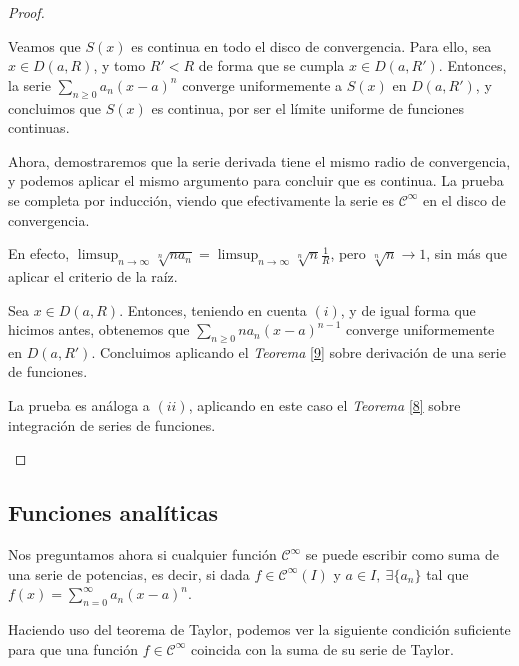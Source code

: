  \begin{proof} \hfill
  \begin{nlist}
     \item Veamos que $S(x)$ es continua en todo el disco de convergencia. Para ello, sea $x \in D(a,R)$, y tomo $R' < R$ de forma que se cumpla $x \in D(a,R')$. Entonces, la serie $\sum_{n\geq 0} a_n (x-a)^n$ converge uniformemente a $S(x)$ en $D(a,R')$, y concluimos que $S(x)$ es continua, por ser el límite uniforme de funciones continuas.

   Ahora, demostraremos que la serie derivada tiene el mismo radio de convergencia, y podemos aplicar el mismo argumento para concluir que es continua. La prueba se completa por inducción, viendo que efectivamente la serie es $\mathcal C^\infty$ en el disco de convergencia.

   En efecto, $\displaystyle\limsup_{n\to\infty}\sqrt[n]{n a_n} = \limsup_{n\to\infty} \sqrt[n]{n} \frac{1}{R}$, pero $\sqrt[n]{n} \to 1$, sin más que aplicar el criterio de la raíz.

   \item Sea $x \in D(a,R)$. Entonces, teniendo en cuenta $(i)$, y de igual forma que hicimos antes, obtenemos que $\sum_{n\ge0} na_n(x-a)^{n-1}$ converge uniformemente en $D(a,R')$. Concluimos aplicando el \textit{Teorema} \ref{9} sobre derivación de una serie de funciones.
   \item La prueba es análoga a $(ii)$, aplicando en este caso el \textit{Teorema} \ref{8} sobre integración de series de funciones.
  \end{nlist}
  \end{proof}





\subsection{Funciones analíticas}

Nos preguntamos ahora si cualquier función $\mathcal{C}^{\infty}$ se puede escribir como suma de una serie de potencias, es decir, si dada $f \in \mathcal{C}^{\infty}(I)$ y $a \in I, \ \exists \{a_n\}$ tal que $f(x) = \sum_{n=0}^{\infty}a_n(x-a)^n$.


Haciendo uso del teorema de Taylor, podemos ver la siguiente condici\'on suficiente para que una funci\'on $f\in \mathcal{C}^\infty$ coincida con la suma de su serie de Taylor.


